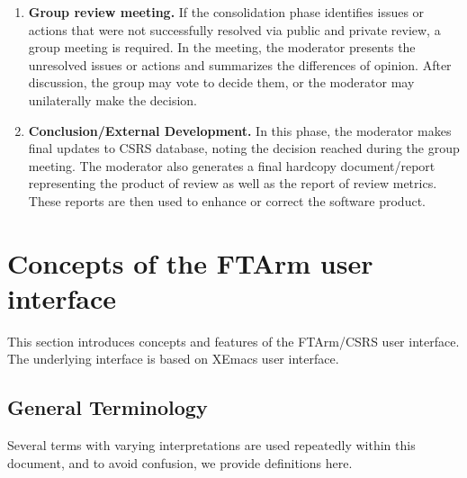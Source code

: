 \begin{enumerate}
\item {\bf Group review meeting.}
If the consolidation phase identifies issues or actions that were not
successfully resolved via public and private review, a group meeting
is required.
In the meeting, the moderator presents the unresolved issues or
actions and summarizes the differences of opinion. After discussion,
the group may vote to decide them, or the moderator may unilaterally
make the decision. 

\item {\bf Conclusion/External Development.}
In this phase, the moderator makes final updates to CSRS database,
noting the decision reached during the group meeting.
The moderator also generates a final hardcopy document/report
representing the product of review as well as the report of review
metrics.  These reports are then used to enhance or correct the
software product.

\end{enumerate}

\section {Concepts of the FTArm user interface}
This section introduces concepts and features of the FTArm/CSRS user
interface. The underlying interface is based on XEmacs user interface.

\subsection{General Terminology}
Several terms with varying interpretations are used repeatedly within
this document, and to avoid confusion, we provide definitions here.

